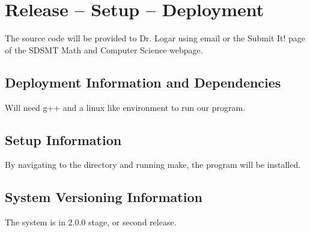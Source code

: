
\chapter{Release -- Setup -- Deployment}
The source code will be provided to Dr. Logar using email or the Submit It! page of
the SDSMT Math and Computer Science webpage.


\section{Deployment Information and Dependencies}
Will need g++ and a linux like environment to run our program.


\section{Setup Information}
By navigating to the directory and running make, the program will be installed.


\section{System  Versioning Information}
The system is in 2.0.0 stage, or second release.
